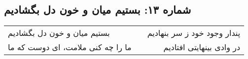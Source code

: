 \begin{center}
\section*{شماره ۱۳: بستیم میان و خون دل بگشادیم}
\label{sec:013}
\begin{longtable}{l p{0.5cm} r}
بستیم میان و خون دل بگشادیم
&&
پندار وجود خود ز سر بنهادیم
\\
ما را چه کنی ملامت، ای دوست که ما
&&
در وادی بینهایتی افتادیم
\\
\end{longtable}
\end{center}
